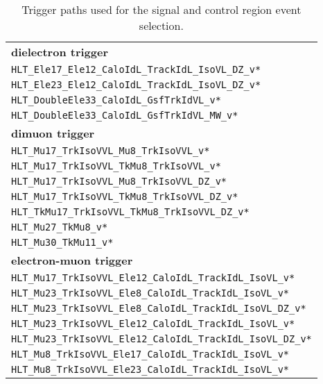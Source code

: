 \begin{table}[htb]
 \centering
 \caption{Trigger paths used for the signal and control region event selection.}
 \normalsize
 \label{tab:app_trigger1}
 \begin{tabular}[width=\textwidth]{l}
  \hline
  \normalsize{\textbf{dielectron trigger}}    \\
  \verb|HLT_Ele17_Ele12_CaloIdL_TrackIdL_IsoVL_DZ_v*|                     \\
  \verb|HLT_Ele23_Ele12_CaloIdL_TrackIdL_IsoVL_DZ_v*|                     \\
  \verb|HLT_DoubleEle33_CaloIdL_GsfTrkIdVL_v*|                     \\
  \verb|HLT_DoubleEle33_CaloIdL_GsfTrkIdVL_MW_v*|                     \\
  \normalsize{\textbf{dimuon trigger}}        \\
  \verb|HLT_Mu17_TrkIsoVVL_Mu8_TrkIsoVVL_v*|                     \\
  \verb|HLT_Mu17_TrkIsoVVL_TkMu8_TrkIsoVVL_v*|                     \\
  \verb|HLT_Mu17_TrkIsoVVL_Mu8_TrkIsoVVL_DZ_v*|                     \\
  \verb|HLT_Mu17_TrkIsoVVL_TkMu8_TrkIsoVVL_DZ_v*|                     \\
  \verb|HLT_TkMu17_TrkIsoVVL_TkMu8_TrkIsoVVL_DZ_v*|                     \\
  \verb|HLT_Mu27_TkMu8_v*|                     \\
  \verb|HLT_Mu30_TkMu11_v*|                     \\
  \normalsize{\textbf{electron-muon trigger}} \\
  \verb|HLT_Mu17_TrkIsoVVL_Ele12_CaloIdL_TrackIdL_IsoVL_v*|                     \\
  \verb|HLT_Mu23_TrkIsoVVL_Ele8_CaloIdL_TrackIdL_IsoVL_v*|                     \\
  \verb|HLT_Mu23_TrkIsoVVL_Ele8_CaloIdL_TrackIdL_IsoVL_DZ_v*|                     \\
  \verb|HLT_Mu23_TrkIsoVVL_Ele12_CaloIdL_TrackIdL_IsoVL_v*|                     \\
  \verb|HLT_Mu23_TrkIsoVVL_Ele12_CaloIdL_TrackIdL_IsoVL_DZ_v*|                     \\
  \verb|HLT_Mu8_TrkIsoVVL_Ele17_CaloIdL_TrackIdL_IsoVL_v*|                     \\
  \verb|HLT_Mu8_TrkIsoVVL_Ele23_CaloIdL_TrackIdL_IsoVL_v*|                     \\

\end{tabular}
\end{table}
